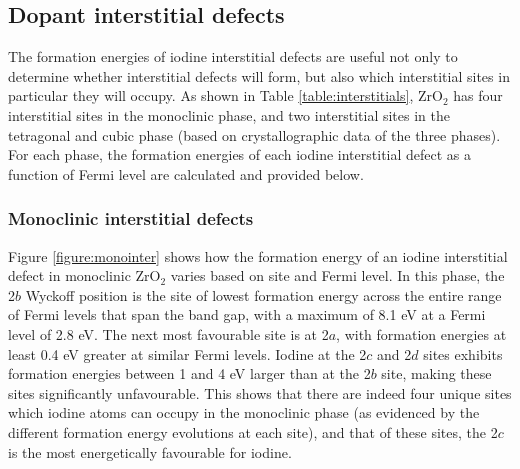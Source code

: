 %
%      

\subsection{Dopant interstitial defects}

The formation energies of iodine interstitial defects are useful not only to determine whether interstitial defects will form, but also which interstitial sites in particular they will occupy. As shown in Table \ref{table:interstitials}, ZrO$_{2}$ has four interstitial sites in the monoclinic phase, and two interstitial sites in the tetragonal and cubic phase (based on crystallographic data of the three phases). For each phase, the formation energies of each iodine interstitial defect as a function of Fermi level are calculated and provided below.

\subsubsection{Monoclinic interstitial defects}

Figure \ref{figure:monointer} shows how the formation energy of an iodine interstitial defect in monoclinic ZrO$_{2}$ varies based on site and Fermi level. In this phase, the 2$b$ Wyckoff position is the site of lowest formation energy across the entire range of Fermi levels that span the band gap, with a maximum of 8.1 eV at a Fermi level of 2.8 eV.  The next most favourable site is at 2$a$, with formation energies at least 0.4 eV greater at similar Fermi levels. Iodine at the 2$c$ and 2$d$ sites exhibits formation energies between 1 and 4 eV larger than at the 2$b$ site, making these sites significantly unfavourable. This shows that there are indeed four unique sites which iodine atoms can occupy in the monoclinic phase (as evidenced by the different formation energy evolutions at each site), and that of these sites, the 2$c$ is the most energetically favourable for iodine.

